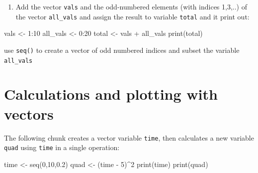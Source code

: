 \documentclass[
  letterpaper,
  DIV=11,
  numbers=noendperiod]{scrreprt}
\newenvironment{Shaded}{\begin{snugshade}}{\end{snugshade}}
\newcommand{\NormalTok}[1]{\textcolor[rgb]{0.00,0.23,0.31}{#1}}
\providecommand{\tightlist}{%
  \setlength{\itemsep}{0pt}\setlength{\parskip}{0pt}}\usepackage{longtable,booktabs,array}
\begin{document}
\begin{enumerate}
\def\labelenumi{\arabic{enumi}.}
\setcounter{enumi}{4}
\tightlist
\item
  Add the vector \texttt{vals} and the odd-numbered elements (with
  indices 1,3,..) of the vector \texttt{all\_vals} and assign the result
  to variable \texttt{total} and it print out:
\end{enumerate}

\begin{Shaded}
\begin{Highlighting}[]
\NormalTok{vals \textless{}{-} 1:10}
\NormalTok{all\_vals \textless{}{-} 0:20}
\NormalTok{total \textless{}{-} vals + all\_vals}
\NormalTok{print(total)}
\end{Highlighting}
\end{Shaded}

\begin{tcolorbox}[enhanced jigsaw, arc=.35mm, colframe=quarto-callout-caution-color-frame, left=2mm, opacitybacktitle=0.6, breakable, title=\textcolor{quarto-callout-caution-color}{\faFire}\hspace{0.5em}{Hint}, toprule=.15mm, coltitle=black, bottomtitle=1mm, toptitle=1mm, colback=white, leftrule=.75mm, colbacktitle=quarto-callout-caution-color!10!white, titlerule=0mm, opacityback=0, rightrule=.15mm, bottomrule=.15mm]

use \texttt{seq()} to create a vector of odd numbered indices and subset
the variable \texttt{all\_vals}

\end{tcolorbox}

\hypertarget{calculations-and-plotting-with-vectors}{%
\section*{Calculations and plotting with
vectors}\label{calculations-and-plotting-with-vectors}}


The following chunk creates a vector variable \texttt{time}, then
calculates a new variable \texttt{quad} using \texttt{time} in a single
operation:

\begin{Shaded}
\begin{Highlighting}[]
\NormalTok{time \textless{}{-} seq(0,10,0.2)}
\NormalTok{quad \textless{}{-} (time {-} 5)\^{}2}
\NormalTok{print(time)}
\NormalTok{print(quad)}
\end{Highlighting}
\end{Shaded}
\end{document}
